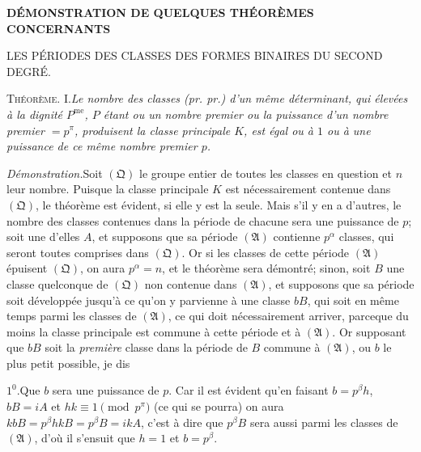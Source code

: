 \clearpage
{}%
\renewcommand{\BookRunningTitle}{Démonstration de quelques théorèmes}
\begin{center}
\Large\bfseries DÉMONSTRATION DE QUELQUES THÉORÈMES CONCERNANTS\par\medskip
\large LES PÉRIODES DES CLASSES DES FORMES BINAIRES DU SECOND DEGRÉ.
\end{center}

\textsc{Théorème. I.}\quad\emph{Le nombre des classes (pr. pr.) d’un même déterminant, qui élevées à la dignité $P^{\mathrm{me}}$, $P$ étant ou un nombre premier ou la puissance d’un nombre premier $=p^\pi$, produisent la classe principale $K$, est égal ou à $1$ ou à une puissance de ce même nombre premier $p$.}

\emph{Démonstration.}\quad Soit $(\mathfrak Q)$ le groupe entier de toutes les classes en question et $n$ leur nombre. Puisque la classe principale $K$ est nécessairement contenue dans $(\mathfrak Q)$, le théorème est évident, si elle y est la seule. Mais s’il y en a d’autres, le nombre des classes contenues dans la période de chacune sera une puissance de $p$; soit une d’elles $A$, et supposons que sa période $(\mathfrak A)$ contienne $p^\alpha$ classes, qui seront toutes comprises dans $(\mathfrak Q)$. Or si les classes de cette période $(\mathfrak A)$ épuisent $(\mathfrak Q)$, on aura $p^\alpha=n$, et le théorème sera démontré; sinon, soit $B$ une classe quelconque de $(\mathfrak Q)$ non contenue dans $(\mathfrak A)$, et supposons que sa période soit développée jusqu’à ce qu’on y parvienne à une classe $bB$, qui soit en même temps parmi les classes de $(\mathfrak A)$, ce qui doit nécessairement arriver, parceque du moins la classe principale est commune à cette période et à $(\mathfrak A)$. Or supposant que $bB$ soit la \emph{première} classe dans la période de $B$ commune à $(\mathfrak A)$, ou $b$ le plus petit possible, je dis

$1^0$.\quad Que $b$ sera une puissance de $p$. Car il est évident qu’en faisant $b=p^\beta h$, $bB=iA$ et $hk\equiv1\pmod{p^\pi}$ (ce qui se pourra) on aura $kbB=p^\beta hkB=p^\beta B=ikA$,
%
c’est à dire que $p^\beta B$ sera aussi parmi les classes de $(\mathfrak A)$, d’où il s’ensuit que $h=1$ et $b=p^\beta$.

